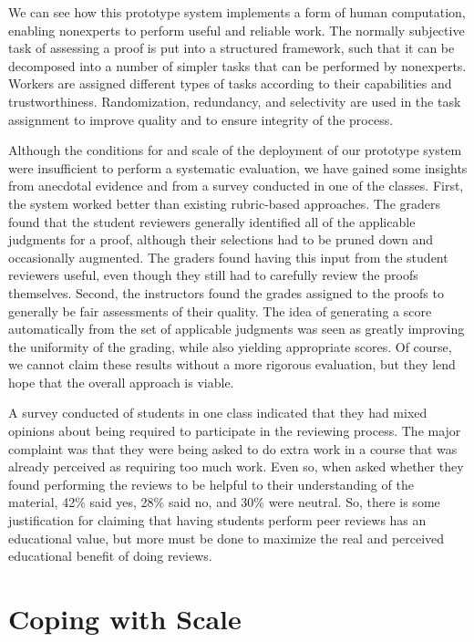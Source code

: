 \documentclass[12pt]{article}
\begin{document}
We can see how this prototype system implements a form of human computation,
enabling nonexperts to perform useful and reliable work.  The normally
subjective task of assessing a proof is put into a structured
framework, such that it can be decomposed into a number of simpler
tasks that can be performed by nonexperts.  Workers are assigned
different types of tasks according to their capabilities and trustworthiness.
Randomization, redundancy, and selectivity are used in the task assignment to
improve quality and to ensure integrity of the process.

Although the conditions for and scale of the deployment of our
prototype system were insufficient to perform a systematic evaluation,
we have gained some insights from anecdotal evidence and from a survey
conducted in one of the classes.  First, the system worked better than existing
rubric-based approaches.
The graders found that the student
reviewers generally identified all of the applicable judgments for a
proof, although their selections had to be pruned down and
occasionally augmented.  The graders found having this input from the
student reviewers useful, even though they still had to carefully
review the proofs themselves.  Second, the instructors found the
grades assigned to the proofs to generally be fair assessments of
their quality.  The idea of generating a score automatically from the
set of applicable judgments was seen as greatly improving the
uniformity of the grading, while also yielding appropriate scores.
Of course, we cannot claim these results without a more rigorous
evaluation, but they lend hope that the overall approach is viable.

A survey conducted of students in one class indicated that they had
mixed opinions about being required to participate in the reviewing
process.  The major complaint was that they were being asked to do
extra work in a course that was already perceived as requiring too much
work.  Even so, when asked whether they found performing the reviews
to be helpful to their understanding of the material, 42\% said yes,
28\% said no, and 30\% were neutral.  So, there is some justification
for claiming that having students perform peer reviews has an educational
value, but more must be done to maximize the real and perceived
educational benefit of doing reviews.

\section{Coping with Scale}
\end{document}
